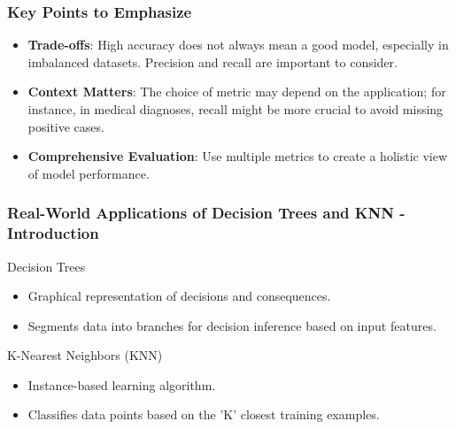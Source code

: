 \documentclass[aspectratio=169]{beamer}
\begin{document}
\begin{frame}[fragile]
    \frametitle{Key Points to Emphasize}
    \begin{itemize}
        \item \textbf{Trade-offs}: High accuracy does not always mean a good model, especially in imbalanced datasets. Precision and recall are important to consider.
        \item \textbf{Context Matters}: The choice of metric may depend on the application; for instance, in medical diagnoses, recall might be more crucial to avoid missing positive cases.
        \item \textbf{Comprehensive Evaluation}: Use multiple metrics to create a holistic view of model performance.
    \end{itemize}
\end{frame}

\begin{frame}[fragile]
    \frametitle{Real-World Applications of Decision Trees and KNN - Introduction}
    
    \begin{block}{Decision Trees}
        \begin{itemize}
            \item Graphical representation of decisions and consequences.
            \item Segments data into branches for decision inference based on input features.
        \end{itemize}
    \end{block}

    \begin{block}{K-Nearest Neighbors (KNN)}
        \begin{itemize}
            \item Instance-based learning algorithm.
            \item Classifies data points based on the 'K' closest training examples.
        \end{itemize}
    \end{block}
\end{frame}
\end{document}
